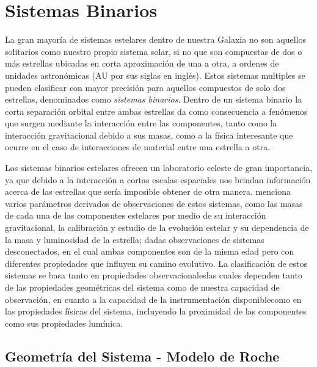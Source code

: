 \chapter{Sistemas Binarios} \label{capituloSistemasBinarios}

La gran mayoría de sistemas estelares dentro de nuestra Galaxia no son aquellos
solitarios como nuestro propio sistema solar, si no que son compuestas de dos o
más estrellas ubicadas en corta aproximación de una a otra, a ordenes de
unidades astronómicas (AU por sus siglas en inglés). Estos sistemas multiples se
pueden clasificar con mayor precisión para aquellos compuestos de solo dos
estrellas, denominados como \textit{sistemas binarios}. Dentro de un sistema
binario la corta separación orbital entre ambas estrellas da como consecuencia a
fenómenos que surgen mediante la interacción entre las componentes, tanto como
la interacción gravitacional debido a sus masas, como a la física interesante
que ocurre en el caso de interacciones de material entre una estrella a otra. 

Los sistemas binarios estelares ofrecen un laboratorio celeste de gran
importancia, ya que debido a la interacción a cortas escalas espaciales nos
brindan información acerca de las estrellas que sería imposible obtener de otra
manera.  menciona varios
parámetros derivados de observaciones de estos sistemas, como las masas de cada
una de las componentes estelares por medio de su interacción gravitacional, la
calibración y estudio de la evolución estelar y su dependencia de la masa y
luminosidad de la estrella; dadas observaciones de sistemas desconectados, en el
cual ambas componentes son de la misma edad pero con diferentes propiedades que
influyen su camino evolutivo. La clasificación de estos sistemas se basa tanto
en propiedades observacionales\textemdash las cuales dependen tanto de las
propiedades geométricas del sistema como de nuestra capacidad de observación, en
cuanto a la capacidad de la instrumentación disponible\textemdash como en las
propiedades físicas del sistema, incluyendo la proximidad de las componentes
como sus propiedades lumínica.

\section{Geometría del Sistema - Modelo de Roche}

